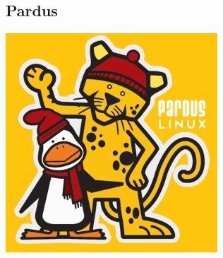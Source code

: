 \documentclass{beamer}
\begin{document}
	\subsection{Pardus}
	\begin{frame}
	 \includegraphics{img/pardus.jpg}
	\end{frame}
\end{document}
